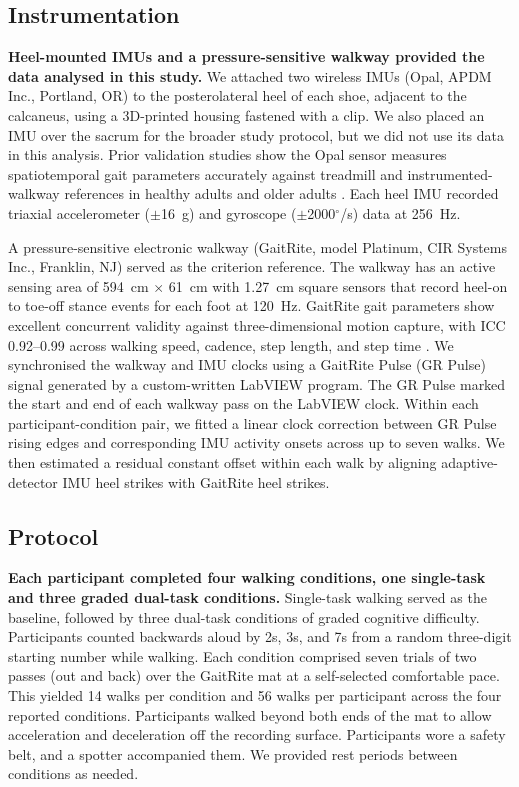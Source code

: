 \documentclass[11pt]{article}
\newcommand{\dps}{$^{\circ}$/s}
\begin{document}
\subsection{Instrumentation}

\textbf{Heel-mounted IMUs and a pressure-sensitive walkway provided the data analysed in this study.}
We attached two wireless IMUs (Opal, APDM Inc., Portland, OR) to the posterolateral heel of each shoe, adjacent to the calcaneus, using a 3D-printed housing fastened with a clip. We also placed an IMU over the sacrum for the broader study protocol, but we did not use its data in this analysis. Prior validation studies show the Opal sensor measures spatiotemporal gait parameters accurately against treadmill and instrumented-walkway references in healthy adults and older adults \citep{Washabaugh2017, Morris2019}. Each heel IMU recorded triaxial accelerometer ($\pm$16~g) and gyroscope ($\pm$2000\dps) data at 256~Hz.

A pressure-sensitive electronic walkway (GaitRite, model Platinum, CIR Systems Inc., Franklin, NJ) served as the criterion reference. The walkway has an active sensing area of 594~cm $\times$ 61~cm with 1.27~cm square sensors that record heel-on to toe-off stance events for each foot at 120~Hz. GaitRite gait parameters show excellent concurrent validity against three-dimensional motion capture, with ICC 0.92--0.99 across walking speed, cadence, step length, and step time \citep{Webster2005}. We synchronised the walkway and IMU clocks using a GaitRite Pulse (GR Pulse) signal generated by a custom-written LabVIEW program. The GR Pulse marked the start and end of each walkway pass on the LabVIEW clock. Within each participant-condition pair, we fitted a linear clock correction between GR Pulse rising edges and corresponding IMU activity onsets across up to seven walks. We then estimated a residual constant offset within each walk by aligning adaptive-detector IMU heel strikes with GaitRite heel strikes.

\subsection{Protocol}

\textbf{Each participant completed four walking conditions, one single-task and three graded dual-task conditions.}
Single-task walking served as the baseline, followed by three dual-task conditions of graded cognitive difficulty. Participants counted backwards aloud by 2s, 3s, and 7s from a random three-digit starting number while walking. Each condition comprised seven trials of two passes (out and back) over the GaitRite mat at a self-selected comfortable pace. This yielded 14 walks per condition and 56 walks per participant across the four reported conditions. Participants walked beyond both ends of the mat to allow acceleration and deceleration off the recording surface. Participants wore a safety belt, and a spotter accompanied them. We provided rest periods between conditions as needed.
\end{document}
